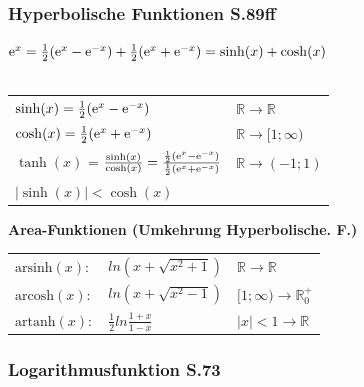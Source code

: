 		\subsubsection{Hyperbolische Funktionen S.89ff}
			$\mathrm{e}^x = \frac{1}{2} (\mathrm{e}^x - \mathrm{e}^{-x}) + \frac{1}{2} (\mathrm{e}^x + \mathrm{e}^{-x}) = \sinh(x) + \cosh(x)$ \\
			\\
			\begin{tabular}{ll}
				$\sinh(x) = \frac{1}{2} (\mathrm{e}^x - \mathrm{e}^{-x})$ & $\mathbb{R} \rightarrow \mathbb{R}$ \\
				$\cosh(x) = \frac{1}{2} (\mathrm{e}^x + \mathrm{e}^{-x})$ & $\mathbb{R} \rightarrow [1; \infty)$ \\
				$\tanh(x)$ = $\frac{\sinh(x)}{\cosh(x)} = \frac{\frac{1}{2} (\mathrm{e}^x - \mathrm{e}^{-x})}{\frac{1}{2} (\mathrm{e}^x + \mathrm{e}^{-x})}$ & $\mathbb{R} \rightarrow (-1; 1)$ \\	
				$\vert \sinh(x) \vert < \cosh(x)$	& \\
			\end{tabular}
			
			\textbf{Area-Funktionen (Umkehrung Hyperbolische. F.)} \\
				\begin{tabular}{lll}
					$\mathrm{arsinh}(x): $ & $ln(x + \sqrt{x^2+1})$         & $\mathbb{R} \rightarrow \mathbb{R}$ \\
					$\mathrm{arcosh}(x): $ & $ln(x + \sqrt{x^2-1})$         & $[1; \infty) \rightarrow \mathbb{R}^+_0$  \\
					$\mathrm{artanh}(x): $ & $\frac{1}{2}ln\frac{1+x}{1-x}$ & $ \vert x \vert < 1 \rightarrow \mathbb{R} $ \\			
				\end{tabular}
			
		\subsubsection{Logarithmusfunktion S.73}
				
